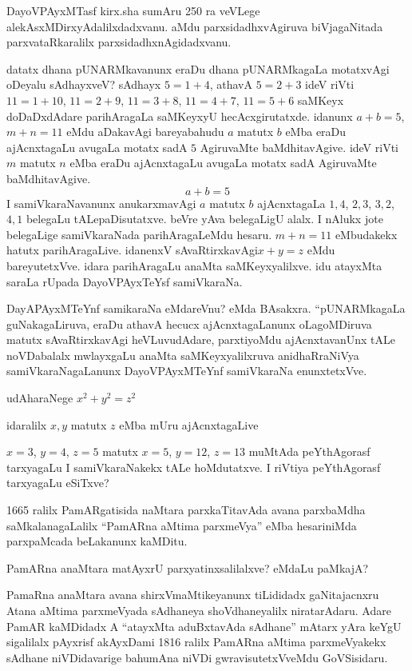 DayoVPAyxMTasf kirx.sha sumAru {\rm 250} ra veVLege alekAsxMDirxyAdalilxdadxvanu. aMdu parxsidadhxvAgiruva biVjagaNitada parxvataRkaralilx parxsidadhxnAgidadxvanu.

datatx dhana pUNARMkavanunx eraDu dhana pUNARMkagaLa motatxvAgi oDeyalu sAdhayxveV? sAdhayx \quad $5=1+4$, \quad athavA \quad $5=2+3$ \quad ideV riVti \quad $11=1+10$, \quad $11=2+9$, \quad $11=3+8$, \quad $11=4+7$, \quad $11=5+6$ \quad saMKeyx doDaDxdAdare parihAragaLa saMKeyxyU hecAcxgirutatxde. idanunx \quad $a+b=5$, \quad $m+n=11$ \quad eMdu aDakavAgi bareyabahudu \quad $a$ \quad matutx \quad $b$ \quad eMba eraDu ajAcnxtagaLu avugaLa motatx sadA $5$ AgiruvaMte baMdhitavAgive. ideV riVti \quad $m$ \quad matutx \quad $n$ \quad eMba eraDu ajAcnxtagaLu avugaLa motatx sadA AgiruvaMte baMdhitavAgive.
$$
a+b=5
$$
I samiVkaraNavanunx anukarxmavAgi $a$ matutx $b$ ajAcnxtagaLa \quad $1, 4$, \quad $2, 3$, \quad $3, 2$, $4, 1$ \quad belegaLu tALepaDisutatxve. beVre yAva belegaLigU alalx. I nAlukx jote belegaLige samiVkaraNada parihAragaLeMdu hesaru. \quad $m+n=11$ \quad eMbudakekx hatutx parihAragaLive. idanenxV sAvaRtirxkavAgi\quad  $x+y=z$ \quad eMdu bareyutetxVve. idara parihAragaLu anaMta saMKeyxyalilxve. idu atayxMta saraLa rUpada DayoVPAyxTeYsf samiVkaraNa.

DayAPAyxMTeYnf samikaraNa eMdareVnu? eMda BAsakxra. ``pUNARMkagaLa guNaka\-gaLiruva, eraDu athavA hecucx ajAcnxtagaLanunx oLagoMDiruva matutx sAvaRtirxkavAgi heVLuvudAdare, parxtiyoMdu ajAcnxtavanUnx tALe noVDabalalx mwlayxgaLu anaMta saMKeyxyalilxruva anidhaRraNiVya samiVkaraNagaLanunx DayoVPAyxMTeYnf samiVkaraNa enunxtetxVve.

udAharaNege \quad $x^2+y^2=z^2$

idaralilx $x, y$ matutx $z$ eMba mUru ajAcnxtagaLive 

$x=3$, \quad $y=4$, \quad $z=5$ \quad matutx \quad $x=5$, \quad $y=12$, \quad $z=13$ \quad muMtAda peYthAgorasf tarxyagaLu I samiVkaraNakekx tALe hoMdutatxve. I riVtiya peYthAgorasf tarxyagaLu eSiTxve? 

{\rm 1665} ralilx PamARgatisida naMtara parxkaTitavAda avana parxbaMdha saMkalanagaLalilx ``PamARna aMtima parxmeVya'' eMba hesariniMda parxpaMcada beLakanunx kaMDitu.

PamARna anaMtara matAyxrU parxyatinxsalilalxve? eMdaLu paMkajA?

PamaRna anaMtara avana shirxVmaMtikeyanunx tiLididadx gaNitajacnxru Atana aMtima parxmeVyada sAdhaneya shoVdhaneyalilx niratarAdaru. Adare PamAR kaMDidadx A ``atayxMta aduBxtavAda sAdhane'' mAtarx yAra keYgU sigalilalx pAyxrisf akAyxDami {\rm 1816} ralilx PamARna aMtima parxmeVyakekx sAdhane niVDidavarige bahumAna niVDi gwravisutetxVveMdu  GoVSisidaru.

